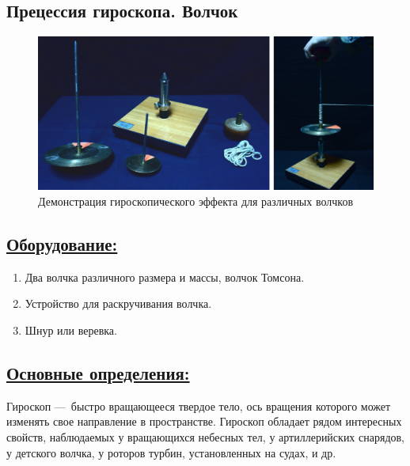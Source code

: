 \documentclass[14pt,a4paper,oneside]{extarticle}	%
\begin{document}
	
	
	\begin{center}
		\subsection*{Прецессия гироскопа. Волчок}
	\end{center}
	
	\begin{figure}[H] 	
		\centering 	
		\includegraphics[width=0.9\linewidth]{gyro-4.png}
		\caption{Демонстрация гироскопического эффекта для различных волчков}
		\label{gyro-4}
	\end{figure}
	
	\subsection*{\underline{Оборудование:}}

			\begin{enumerate} 
			\item Два волчка различного размера и массы, волчок Томсона.
			\item Устройство для раскручивания волчка.
			\item Шнур или веревка.
		\end{enumerate}

\newpage
		\subsection*{\underline{Основные определения:}}
	
	Гироскоп — быстро вращающееся твердое тело, ось вращения которого может изменять 
	свое направление в пространстве.
	Гироскоп обладает рядом интересных свойств, наблюдаемых у вращающихся небесных тел, у артиллерийских снарядов, у детского волчка, у роторов турбин, установленных на судах, и др.
	
\end{document}

